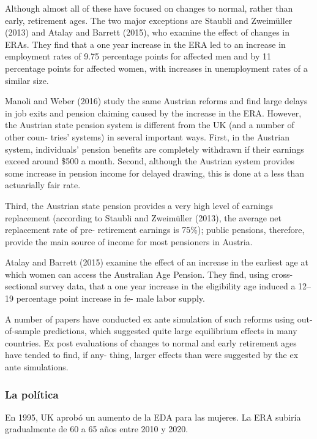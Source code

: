 \documentclass[]{article}
\begin{document}
Although almost all of these have focused on changes to normal, rather
than early, retirement ages. The two major exceptions are Staubli and
Zweimüller (2013) and Atalay and Barrett (2015), who examine the effect
of changes in ERAs. They find that a one year increase in the ERA led to
an increase in employment rates of 9.75 percentage points for affected
men and by 11 percentage points for affected women, with increases in
unemployment rates of a similar size.

Manoli and Weber (2016) study the same Austrian reforms and find large
delays in job exits and pension claiming caused by the increase in the
ERA. However, the Austrian state pension system is different from the UK
(and a number of other coun- tries' systems) in several important ways.
First, in the Austrian system, individuals' pension benefits are
completely withdrawn if their earnings exceed around \$500 a month.
Second, although the Austrian system provides some increase in pension
income for delayed drawing, this is done at a less than actuarially fair
rate.

Third, the Austrian state pension provides a very high level of earnings
replacement (according to Staubli and Zweimüller (2013), the average net
replacement rate of pre- retirement earnings is 75\%); public pensions,
therefore, provide the main source of income for most pensioners in
Austria.

Atalay and Barrett (2015) examine the effect of an increase in the
earliest age at which women can access the Australian Age Pension. They
find, using cross-sectional survey data, that a one year increase in the
eligibility age induced a 12--19 percentage point increase in fe- male
labor supply.

A number of papers have conducted ex ante simulation of such reforms
using out-of-sample predictions, which suggested quite large equilibrium
effects in many countries. Ex post evaluations of changes to normal and
early retirement ages have tended to find, if any- thing, larger effects
than were suggested by the ex ante simulations.

\hypertarget{la-poluxedtica}{%
\subsubsection{La política}\label{la-poluxedtica}}

En 1995, UK aprobó un aumento de la EDA para las mujeres. La ERA subiría
gradualmente de 60 a 65 años entre 2010 y 2020.
\end{document}
